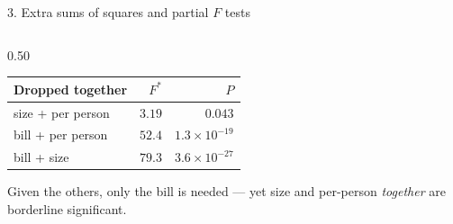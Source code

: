 \documentclass[aspectratio=169,11pt]{beamer}
\begin{document}
\begin{frame}{3. Extra sums of squares and partial $F$ tests}
\begin{columns}[T]
\begin{column}{0.50\textwidth}
    \vspace{0.2em}
    {\scriptsize
    \begin{tabular}{@{}lrr@{}}
      \toprule
      Dropped together & $F^{*}$ & $P$ \\
      \midrule
      size + per person       & $3.19$  & $0.043$ \\
      bill + per person       & $52.4$  & $1.3\times10^{-19}$ \\
      bill + size             & $79.3$  & $3.6\times10^{-27}$ \\
      \bottomrule
    \end{tabular}}

    \vspace{0.4em}
    Given the others, only the bill is needed --- yet size and per-person
    \emph{together} are borderline significant.
  \end{column}
  \end{columns}
\end{frame}
\end{document}
